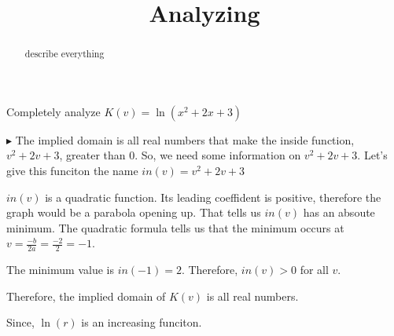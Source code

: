 \documentclass{ximera}
\title{Analyzing}
\begin{document}
\begin{abstract}
describe everything
\end{abstract}
\maketitle







Completely analyze $K(v) = \ln(x^2+2x+3)$

$\blacktriangleright$  The implied domain is all real numbers that make the inside function, $v^2+2v+3$, greater than $0$.  So, we need some information on $v^2+2v+3$.   Let's give this funciton the name $in(v) = v^2+2v+3$

$in(v)$ is a quadratic function.  Its leading coeffident is positive, therefore the graph would be a parabola opening up.  That tells us $in(v)$ has an absoute minimum.  The quadratic formula tells us that the minimum occurs at $v=\frac{-b}{2a} = \frac{-2}{2} = -1$.

The minimum value is $in(-1) = 2$.  Therefore, $in(v) > 0$ for all $v$.

Therefore, the implied domain of $K(v)$ is all real numbers.

Since, $\ln(r)$ is an increasing funciton.
\end{document}

